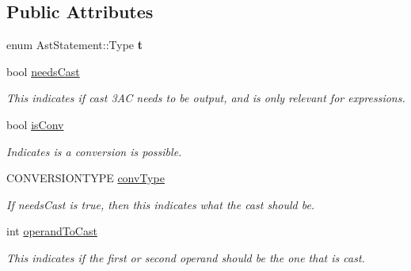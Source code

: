 \subsection*{Public Attributes}
\begin{DoxyCompactItemize}
\item 
\hypertarget{classAstStatement_a79670f71bfdd5ba5c3c386c3b5f8e5dd}{enum Ast\-Statement\-::\-Type {\bfseries t}}\label{classAstStatement_a79670f71bfdd5ba5c3c386c3b5f8e5dd}

\item 
\hypertarget{classAST_aaf215802de409f8096c063d01ffa6783}{bool \hyperlink{classAST_aaf215802de409f8096c063d01ffa6783}{needs\-Cast}}\label{classAST_aaf215802de409f8096c063d01ffa6783}

\begin{DoxyCompactList}\small\item\em This indicates if cast 3\-A\-C needs to be output, and is only relevant for expressions. \end{DoxyCompactList}\item 
\hypertarget{classAST_afa9e77ef650ec6664458fa6cb55be985}{bool \hyperlink{classAST_afa9e77ef650ec6664458fa6cb55be985}{is\-Conv}}\label{classAST_afa9e77ef650ec6664458fa6cb55be985}

\begin{DoxyCompactList}\small\item\em Indicates is a conversion is possible. \end{DoxyCompactList}\item 
\hypertarget{classAST_a61ef3317e023d45237e06615b387cd6b}{C\-O\-N\-V\-E\-R\-S\-I\-O\-N\-T\-Y\-P\-E \hyperlink{classAST_a61ef3317e023d45237e06615b387cd6b}{conv\-Type}}\label{classAST_a61ef3317e023d45237e06615b387cd6b}

\begin{DoxyCompactList}\small\item\em If needs\-Cast is true, then this indicates what the cast should be. \end{DoxyCompactList}\item 
\hypertarget{classAST_aea9b07b39d24183f38c0029cec0a878e}{int \hyperlink{classAST_aea9b07b39d24183f38c0029cec0a878e}{operand\-To\-Cast}}\label{classAST_aea9b07b39d24183f38c0029cec0a878e}

\begin{DoxyCompactList}\small\item\em This indicates if the first or second operand should be the one that is cast. \end{DoxyCompactList}\end{DoxyCompactItemize}
